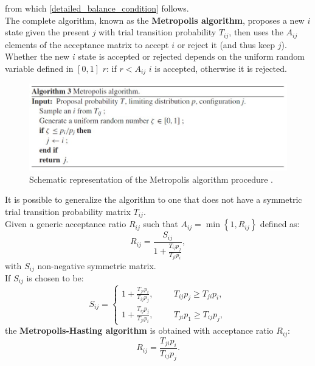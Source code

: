 from which \ref{detailed_balance_condition} follows.\\
The complete algorithm, known as the \textbf{Metropolis algorithm}, proposes a new $i$ state given the present $j$ with trial transition 
probability $T_{ij}$, then uses the $A_{ij}$ elements of the acceptance matrix to accept $i$ or reject it (and thus keep $j$). Whether the new $i$ state 
is accepted or rejected depends on the uniform random variable defined in $[0,1]$ $r$: if $r<A_{ij}$ $i$ is accepted, otherwise it 
is rejected.
\begin{figure}[H]
    \centering
    \includegraphics[scale=0.8]{Metropolis_algo.jpg}
    \caption{Schematic representation of the Metropolis algorithm procedure \cite{gubernatis2016quantum}.}
    \label{fig:Metropolis}
\end{figure}
It is possible to generalize the algorithm to one that does not have a symmetric trial transition probability matrix $T_{ij}$.\\
Given a generic acceptance ratio $R_{ij}$ such that $A_{ij}=\min\left\{1,R_{ij}\right\}$ defined as:
\begin{equation}
    R_{ij}=\frac{S_{ij}}{1+\frac{T_{ij}p_j}{T_{ji}p_i}},
\end{equation}
with $S_{ij}$ non-negative symmetric matrix.\\
If $S_{ij}$ is chosen to be:
\begin{equation}
    S_{ij}=
    \begin{cases}
        1+\frac{T_{ji}p_i}{T_{ij}p_j},\hspace{1cm}T_{ij}p_j\ge T_{ji}p_i,\\
        1+\frac{T_{ij}p_j}{T_{ji}p_i},\hspace{1cm}T_{ji}p_1\ge T_{ij}p_j,
    \end{cases}
\end{equation}
the \textbf{Metropolis-Hasting algorithm} is obtained with acceptance ratio $R_{ij}$:
\begin{equation}
    R_{ij}=\frac{T_{ji}p_i}{T_{ij}p_j}.
    \label{metropolis-hastings_discrete}
\end{equation}
